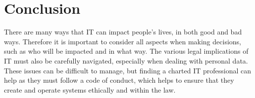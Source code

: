 \documentclass[12pt,a4paper]{article}
\begin{document}
\section{Conclusion}
There are many ways that IT can impact people's lives, in both good and bad ways. Therefore it is important to consider all aspects when making decisions, such as who will be impacted and in what way. The various legal implications of IT must also be carefully navigated, especially when dealing with personal data. These issues can be difficult to manage, but finding a charted IT professional can help as they must follow a code of conduct, which helps to ensure that they create and operate systems ethically and within the law.



\end{document}

